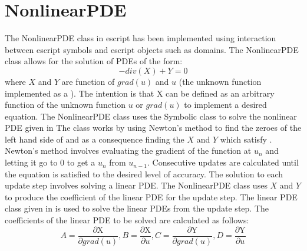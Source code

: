 \section{NonlinearPDE}
The NonlinearPDE class in escript has been implemented using interaction between escript symbols and escript objects such as domains. The NonlinearPDE class allows for the solution of PDEs of the form:
\begin{equation}
-div(X) + Y = 0
\label{symbolic eq1}
\end{equation}
where $X$ and $Y$ are function of $grad(u)$ and $u$ (the unknown function implemented as a \SYMBOL).
The intention is that X can be defined as an arbitrary function of the unknown function $u$ or $grad(u)$ to implement a desired equation.
The NonlinearPDE class uses the Symbolic class to solve the nonlinear PDE given in 
The class works by using Newton's method to find the zeroes of the left hand side of  and as a consequence finding the
$X$ and $Y$ which satisfy . 
Newton's method involves evaluating the gradient of the function at $u_n$ and letting it go to 0 to get a $u_n$ from $u_{n-1}$. Consecutive updates are calculated until the equation is
satisfied to the desired level of accuracy. The solution to each update step involves solving a linear PDE. The NonlinearPDE class uses $X$ and $Y$ to produce the coefficient of the linear PDE for the update step. The linear PDE class given in  is used to solve the linear PDEs from the update step. The coefficients of the linear PDE to be solved are calculated as follows: 
\begin{equation*}
 A = \frac{\partial \text{X}}{\partial grad(u)},   B = \frac{\partial \text{X}}{\partial u},   C = \frac{\partial \text{Y}}{\partial grad(u)},    D = \frac{\partial \text{Y}}{\partial u}
\end{equation*}
